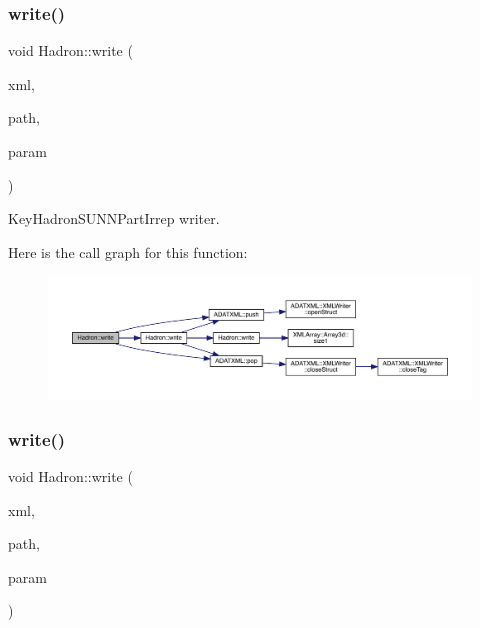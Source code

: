\subsubsection{\texorpdfstring{write()}{write()}\hspace{0.1cm}{\footnotesize\ttfamily [10/95]}}
{\footnotesize\ttfamily void Hadron\+::write (\begin{DoxyParamCaption}\item[{\mbox{\hyperlink{classADATXML_1_1XMLWriter}{X\+M\+L\+Writer}} \&}]{xml,  }\item[{const std\+::string \&}]{path,  }\item[{const \mbox{\hyperlink{structHadron_1_1KeyHadronSUNNPartIrrep__t}{Key\+Hadron\+S\+U\+N\+N\+Part\+Irrep\+\_\+t}} \&}]{param }\end{DoxyParamCaption})}



Key\+Hadron\+S\+U\+N\+N\+Part\+Irrep writer. 

Here is the call graph for this function\+:\nopagebreak
\begin{figure}[H]
\begin{center}
\leavevmode
\includegraphics[width=350pt]{d1/daf/namespaceHadron_a4d280edd65eda86698eae0d619c81a47_cgraph}
\end{center}
\end{figure}
\mbox{\label{namespaceHadron_a649265e2213fc38a7907196da52300cd}} 
\subsubsection{\texorpdfstring{write()}{write()}\hspace{0.1cm}{\footnotesize\ttfamily [11/95]}}
{\footnotesize\ttfamily void Hadron\+::write (\begin{DoxyParamCaption}\item[{\mbox{\hyperlink{classADATXML_1_1XMLWriter}{X\+M\+L\+Writer}} \&}]{xml,  }\item[{const std\+::string \&}]{path,  }\item[{const \mbox{\hyperlink{structHadron_1_1KeyHadronNPartIrrep__t}{Key\+Hadron\+N\+Part\+Irrep\+\_\+t}} \&}]{param }\end{DoxyParamCaption})}



